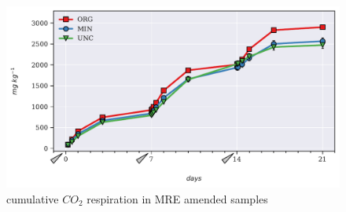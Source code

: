 \documentclass[12pt]{report}
\begin{document}
		\begin{figure}[H]
			\centering
			\includegraphics[scale=0.8]{thesis_figures/test/Cum_Resp.pdf}
			\caption{cumulative $CO_2$ respiration in MRE amended samples}
			\label{fig:cum_resp_treated_main}
		\end{figure}
	
			
		
\end{document}
